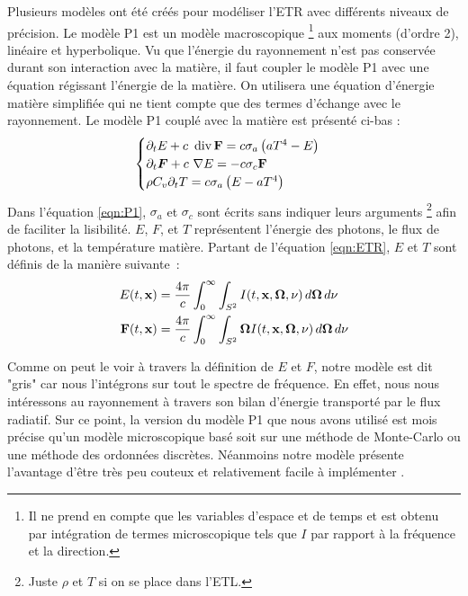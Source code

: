 Plusieurs modèles ont été créés pour modéliser l'ETR avec différents niveaux de précision. Le modèle P1 est un modèle macroscopique \footnote{Il ne prend en compte que les variables d'espace et de temps et est obtenu par intégration de termes microscopique tels que $I$ par rapport à la fréquence et la direction.} aux moments (d'ordre 2), linéaire et hyperbolique. Vu que l'énergie du rayonnement n'est pas conservée durant son interaction avec la matière, il faut coupler le modèle P1 avec une équation régissant l'énergie de la matière. On utilisera une équation d'énergie matière simplifiée qui ne tient compte que des termes d'échange avec le rayonnement. Le modèle P1 couplé avec la matière est présenté ci-bas \parencite{Reference2} :
\begingroup
\large
\begin{equation}
    \begin{cases}
     \partial_tE + c \ \operatorname {div} \mathbf{F} = c\sigma_a\left(aT^4-E\right)\\
     \partial_t\bm{F} + c \ \nabla E = -c\sigma_c \mathbf{F} \\
     \rho C_v \partial_t T = c \sigma_a \left(E-aT^4\right)
    \end{cases}
\label{eqn:P1}
\end{equation}
\endgroup
Dans l'équation \ref{eqn:P1}, $\sigma_a$ et $\sigma_c$ sont écrits sans indiquer leurs arguments \footnote{Juste $\rho$ et $T$ si on se place dans l'ETL.} afin de faciliter la lisibilité. $E$, $F$, et $T$ représentent l'énergie des photons, le flux de photons, et la température matière. Partant de l'équation \ref{eqn:ETR}, $E$ et $T$ sont définis de la manière suivante :
\begin{align*}
E(t,\mathbf{x}) &= \frac{4\pi}{c} \int_{0}^{\infty} \int_{S^2} I(t,\mathbf{x},\bm{\Omega},\nu) \, d\bm{\Omega} \, d\nu \\
\mathbf{F}(t,\mathbf{x}) &= \frac{4\pi}{c} \int_{0}^{\infty} \int_{S^2} \bm{\Omega}I(t,\mathbf{x},\bm{\Omega},\nu) \, d\bm{\Omega} \, d\nu 
\label{eqn:EFT}
\end{align*}

Comme on peut le voir à travers la définition de $E$ et $F$, notre modèle est dit "gris" car nous l'intégrons sur tout le spectre de fréquence. En effet, nous nous intéressons au rayonnement à travers son bilan d'énergie transporté par le flux radiatif. Sur ce point, la version du modèle P1 que nous avons utilisé est mois précise qu'un modèle microscopique basé soit sur une méthode de Monte-Carlo ou une méthode des ordonnées discrètes. Néanmoins notre modèle présente l'avantage d'être très peu couteux et relativement facile à implémenter \parencite{Reference3}. 

